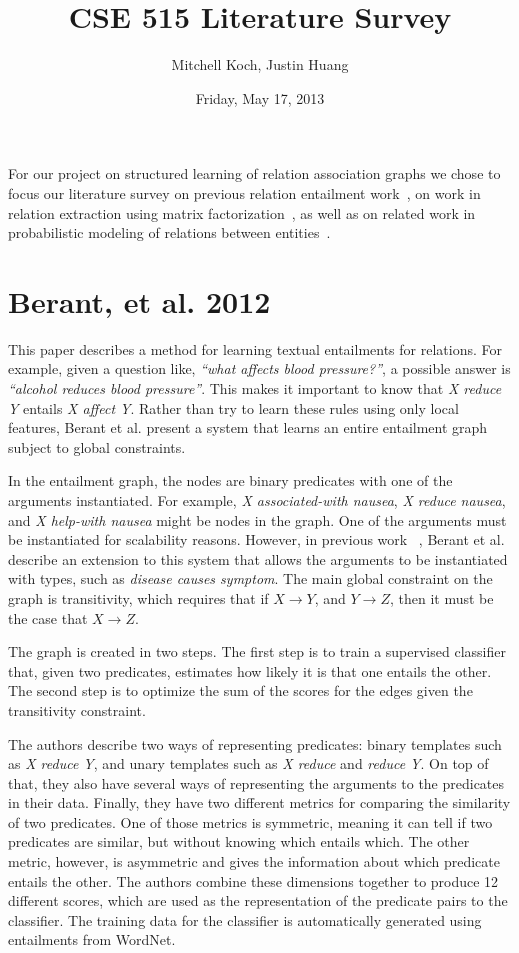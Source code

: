 \documentclass{article}
\author{Mitchell Koch, Justin Huang}
\title{CSE 515 Literature Survey}
\date{Friday, May 17, 2013}
\begin{document}
\maketitle

For our project on structured learning of relation association graphs we chose to focus our literature survey on previous relation entailment work~\cite{Berant:2012:LER:2122944.2122947}, on work in relation extraction using matrix factorization~\cite{riedel13relation}, as well as on related work in probabilistic modeling of relations between entities~\cite{TaskarWAK03}.

\section*{Berant, et al. 2012}

This paper describes a method for learning textual entailments for relations. For example, given a question like, \textit{``what affects blood pressure?''}, a possible answer is \textit{``alcohol reduces blood pressure''}. This makes it important to know that \textit{X reduce Y} entails \textit{X affect Y}. Rather than try to learn these rules using only local features, Berant et al. present a system that learns an entire entailment graph subject to global constraints.

In the entailment graph, the nodes are binary predicates with one of the arguments instantiated. For example, \textit{X associated-with nausea}, \textit{X reduce nausea}, and \textit{X help-with nausea} might be nodes in the graph. One of the arguments must be instantiated for scalability reasons. However, in previous work ~\cite{berant2011global}, Berant et al. describe an extension to this system that allows the arguments to be instantiated with types, such as \textit{disease causes symptom}. The main global constraint on the graph is transitivity, which requires that if $X \rightarrow Y$, and $Y \rightarrow Z$, then it must be the case that $X \rightarrow Z$.

The graph is created in two steps. The first step is to train a supervised classifier that, given two predicates, estimates how likely it is that one entails the other. The second step is to optimize the sum of the scores for the edges given the transitivity constraint.

The authors describe two ways of representing predicates: binary templates such as \textit{X reduce Y}, and unary templates such as \textit{X reduce} and \textit{reduce Y}. On top of that, they also have several ways of representing the arguments to the predicates in their data. Finally, they have two different metrics for comparing the similarity of two predicates. One of those metrics is symmetric, meaning it can tell if two predicates are similar, but without knowing which entails which. The other metric, however, is asymmetric and gives the information about which predicate entails the other. The authors combine these dimensions together to produce 12 different scores, which are used as the representation of the predicate pairs to the classifier. The training data for the classifier is automatically generated using entailments from WordNet.
\end{document}
